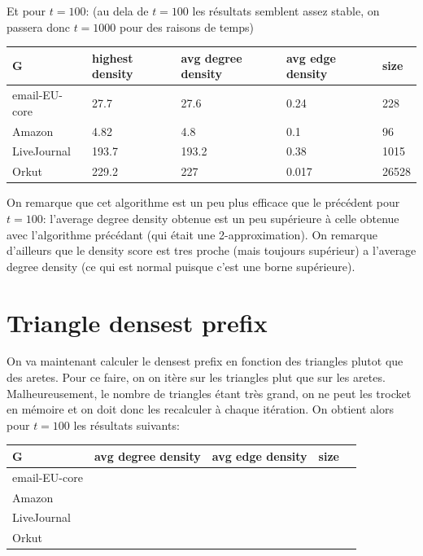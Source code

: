\documentclass{report}
\begin{document}
Et pour $t = 100$: (au dela de $t = 100$ les résultats semblent assez stable, on passera donc $t = 1000$ pour des raisons de temps)
\begin{center}
  \begin{tabular}{|l|l|l|l|l|}
    \hline
    G & highest density & avg degree density & avg edge density & size\\
    \hline
    email-EU-core & 27.7 & 27.6 & 0.24 & 228 \\
    Amazon & 4.82 & 4.8 & 0.1 & 96 \\
    LiveJournal & 193.7 & 193.2 & 0.38 & 1015 \\
    Orkut & 229.2 & 227 & 0.017 & 26528 \\
    \hline
  \end{tabular}
\end{center}

On remarque que cet algorithme est un peu plus efficace que le précédent pour $t = 100$: l'average degree density obtenue est un peu supérieure à celle obtenue avec l'algorithme précédant (qui était une 2-approximation). On remarque d'ailleurs que le density score est tres proche (mais toujours supérieur) a l'average degree density (ce qui est normal puisque c'est une borne supérieure).

\section{Triangle densest prefix}
On va maintenant calculer le densest prefix en fonction des triangles plutot que des aretes. Pour ce faire, on on itère sur les triangles plut que sur les aretes. Malheureusement, le nombre de triangles étant très grand, on ne peut les trocket en mémoire et on doit donc les recalculer à chaque itération. On obtient alors pour $t = 100$ les résultats suivants:
\begin{center}
  \begin{tabular}{|l|l|l|l|l|}
    \hline
    G & avg degree density & avg edge density & size\\
    \hline
    email-EU-core & & & \\
    Amazon & & & \\
    LiveJournal & & & \\
    Orkut & & & \\
    \hline
  \end{tabular}
\end{center}
\end{document}
